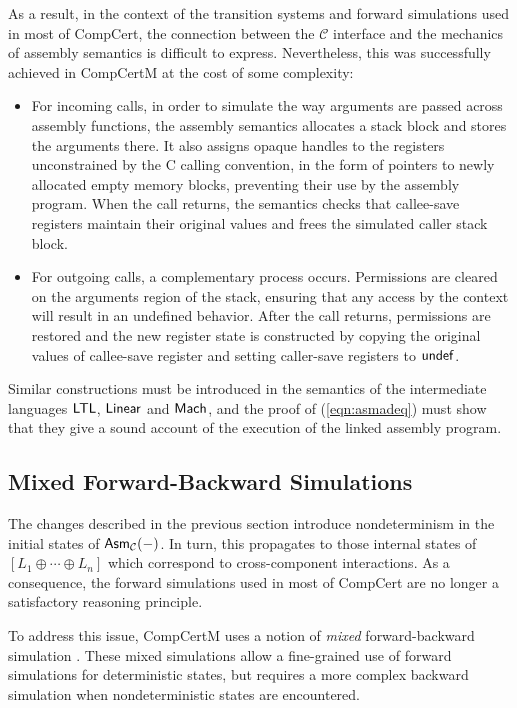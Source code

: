 \documentclass[sigplan,screen]{acmart}
\newenvironment{optional}{}{}
\begin{document}
\begin{optional}
As a result,
in the context of
the transition systems and forward simulations used
in most of CompCert,
the connection between the $\mathcal{C}$ interface
and the mechanics of assembly semantics
is difficult to express.
Nevertheless,
this was successfully achieved in CompCertM
at the cost of some complexity:
\begin{itemize}
\item
For incoming calls,
in order to simulate the way arguments are passed
across assembly functions,
the assembly semantics
allocates a stack block
and stores the arguments there.
It also assigns
opaque handles to the registers unconstrained by the
C calling convention,
in the form of pointers to
newly allocated empty memory blocks,
preventing their use by the assembly program.
When the call returns,
the semantics checks that callee-save registers
maintain their original values
and frees the simulated caller stack block.
\item
For outgoing calls,
a complementary process occurs.
Permissions are cleared on the arguments region of the stack,
ensuring that any access by the context
will result in an undefined behavior.
After the call returns,
permissions are restored
and the new register state is constructed
by copying the original values of callee-save register
and setting caller-save registers to $ \mathsf{undef} $.
\end{itemize}
Similar constructions must be introduced
in the semantics of
the intermediate languages
$ \mathsf{LTL} $, $ \mathsf{Linear} $ and $ \mathsf{Mach} $,
and the proof of (\ref{eqn:asmadeq})
must show that they
give a sound account of the execution
of the linked assembly program.


\subsection{Mixed Forward-Backward Simulations} %

The changes described in the previous section
introduce nondeterminism in the initial states
of $ \mathsf{Asm} _\mathcal{C}(-)$.
In turn,
this propagates to those internal states of
$[L_1 \oplus \cdots \oplus L_n]$
which correspond to cross-component interactions.
As a consequence,
the forward simulations used in most of CompCert
are no longer a satisfactory reasoning principle.

To address this issue,
CompCertM uses a notion of
\emph{mixed} forward-backward simulation \cite{pilsner}.
These mixed simulations allow a fine-grained use of forward simulations
for deterministic states,
but requires a more complex backward simulation
when nondeterministic states are encountered.


\end{optional}
\end{document}
